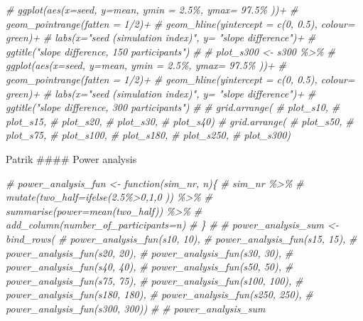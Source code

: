 \documentclass[
]{article}
\newenvironment{Shaded}{\begin{snugshade}}{\end{snugshade}}
\newcommand{\CommentTok}[1]{\textcolor[rgb]{0.56,0.35,0.01}{\textit{#1}}}
\begin{document}
\begin{Shaded}
\begin{Highlighting}[]
\CommentTok{\#   ggplot(aes(x=seed, y=mean, ymin = \textasciigrave{}2.5\%\textasciigrave{}, ymax= \textasciigrave{}97.5\%\textasciigrave{} ))+}
\CommentTok{\#   geom\_pointrange(fatten = 1/2)+}
\CommentTok{\#   geom\_hline(yintercept = c(0, 0.5), colour= \textquotesingle{}green\textquotesingle{})+}
\CommentTok{\#   labs(x="seed (simulation index)", y= "slope difference")+}
\CommentTok{\#   ggtitle("slope difference, 150 participants")}
\CommentTok{\# }
\CommentTok{\# plot\_s300 \textless{}{-} s300 \%\textgreater{}\% }
\CommentTok{\#   ggplot(aes(x=seed, y=mean, ymin = \textasciigrave{}2.5\%\textasciigrave{}, ymax= \textasciigrave{}97.5\%\textasciigrave{} ))+}
\CommentTok{\#   geom\_pointrange(fatten = 1/2)+}
\CommentTok{\#   geom\_hline(yintercept = c(0, 0.5), colour= \textquotesingle{}green\textquotesingle{})+}
\CommentTok{\#   labs(x="seed (simulation index)", y= "slope difference")+}
\CommentTok{\#   ggtitle("slope difference, 300 participants")}
\CommentTok{\# }
\CommentTok{\# grid.arrange(}
\CommentTok{\#   plot\_s10,}
\CommentTok{\#   plot\_s15,}
\CommentTok{\#   plot\_s20,}
\CommentTok{\#   plot\_s30,}
\CommentTok{\#   plot\_s40)}
\CommentTok{\# grid.arrange(}
\CommentTok{\#   plot\_s50,}
\CommentTok{\#   plot\_s75,}
\CommentTok{\#   plot\_s100,}
\CommentTok{\#   plot\_s180,}
\CommentTok{\#   plot\_s250,}
\CommentTok{\#   plot\_s300)}
\end{Highlighting}
\end{Shaded}

Patrik \#\#\#\# Power analysis

\begin{Shaded}
\begin{Highlighting}[]
\CommentTok{\# power\_analysis\_fun \textless{}{-} function(sim\_nr, n)\{}
\CommentTok{\#   sim\_nr \%\textgreater{}\% }
\CommentTok{\#     mutate(two\_half=ifelse(\textasciigrave{}2.5\%\textasciigrave{}\textgreater{}0,1,0 )) \%\textgreater{}\%}
\CommentTok{\#     summarise(power=mean(two\_half)) \%\textgreater{}\% }
\CommentTok{\#     add\_column(number\_of\_participants=n)}
\CommentTok{\# \}}
\CommentTok{\# }
\CommentTok{\# power\_analysis\_sum \textless{}{-} bind\_rows(}
\CommentTok{\#   power\_analysis\_fun(s10, 10),}
\CommentTok{\#   power\_analysis\_fun(s15, 15),}
\CommentTok{\#   power\_analysis\_fun(s20, 20),}
\CommentTok{\#   power\_analysis\_fun(s30, 30),}
\CommentTok{\#   power\_analysis\_fun(s40, 40),}
\CommentTok{\#   power\_analysis\_fun(s50, 50),}
\CommentTok{\#   power\_analysis\_fun(s75, 75),}
\CommentTok{\#   power\_analysis\_fun(s100, 100),}
\CommentTok{\#   power\_analysis\_fun(s180, 180),}
\CommentTok{\#   power\_analysis\_fun(s250, 250),}
\CommentTok{\#   power\_analysis\_fun(s300, 300))}
\CommentTok{\# }
\CommentTok{\# power\_analysis\_sum}
\end{Highlighting}
\end{Shaded}
\end{document}
